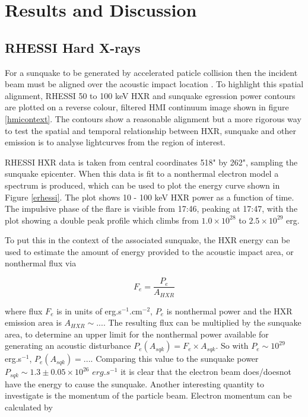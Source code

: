 \section{Results and Discussion}
\subsection{RHESSI Hard X-rays}
For a sunquake to be generated by accelerated paticle collision then the incident beam must be aligned over the acoustic impact location \citep{}. To highlight this spatial alignment, RHESSI 50 to 100 keV HXR and sunquake egression power contours are plotted on a reverse colour, filtered HMI continuum image shown in figure \ref{hmicontext}. The contours show a reasonable alignment but a more rigorous way to test the spatial and temporal relationship between HXR, sunquake and other emission is to analyse lightcurves from the region of interest.   %

RHESSI HXR data is taken from central coordinates 518" by 262", sampling the sunquake epicenter. When this data is fit to a nonthermal electron model a spectrum is produced, which can be used to plot the energy curve shown in Figure \ref{erhessi}. The plot shows 10 - 100 keV HXR power as a function of time. The impulsive phase of the flare is visible from 17:46, peaking at 17:47, with the plot showing a double peak profile which climbs from $1.0{\times}10^{28}$ to $2.5{\times}10^{29}$ erg. 

To put this in the context of the associated sunquake, the HXR energy can be used to estimate the amount of energy provided to the acoustic impact area, or nonthermal flux via

\begin{equation}
F_e = \frac{P_{e}}{A_{HXR}}
\end{equation}

where flux $F_e$ is in units of erg.s$^{-1}$.cm$^{-2}$, $P_e$ is nonthermal power and the HXR emission area is $A_{HXR} \sim ...$. The resulting flux can be multiplied by the sunquake area, to determine an upper limit for the nonthermal power available for generating an acoustic disturbance $P_{e}(A_{sqk}) = F_e{\times}A_{sqk}$. So with $P_e \sim 10^{29}$ erg.s$^{-1}$, $P_{e}(A_{sqk}) = ....$ Comparing this value to the sunquake power $P_{sqk} \sim 1.3\pm0.05{\times}10^{26}$ $erg.s^{-1}$ it is clear that the electron beam does/doesnot have the energy to cause the sunquake. Another interesting quantity to investigate is the momentum of the particle beam. Electron momentum can be calculated by 


